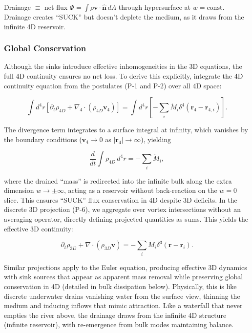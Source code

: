 Drainage $\equiv$ net flux $\Phi = \int \rho \mathbf{v} \cdot \hat{\mathbf{n}} \, dA$ through hypersurface at $w = \text{const}$. Drainage creates ``SUCK'' but doesn't deplete the medium, as it draws from the infinite 4D reservoir.

\subsubsection{Global Conservation}
Although the sinks introduce effective inhomogeneities in the 3D equations, the full 4D continuity ensures no net loss. To derive this explicitly, integrate the 4D continuity equation from the postulates (P-1 and P-2) over all 4D space:

\begin{equation}
\int d^4 r \left[ \partial_t \rho_{4D} + \nabla_4 \cdot (\rho_{4D} \mathbf{v}_4) \right] = \int d^4 r \left[ -\sum_i \dot{M}_i \delta^4(\mathbf{r}_4 - \mathbf{r}_{4,i}) \right].
\end{equation}

The divergence term integrates to a surface integral at infinity, which vanishes by the boundary conditions ($\mathbf{v}_4 \to 0$ as $|\mathbf{r}_4| \to \infty$), yielding

\begin{equation}
\frac{d}{dt} \int \rho_{4D} \, d^4 r = -\sum_i \dot{M}_i,
\end{equation}

where the drained ``mass'' is redirected into the infinite bulk along the extra dimension $w \to \pm \infty$, acting as a reservoir without back-reaction on the $w=0$ slice. This ensures ``SUCK'' flux conservation in 4D despite 3D deficits. In the discrete 3D projection (P-6), we aggregate over vortex intersections without an averaging operator, directly defining projected quantities as sums. This yields the effective 3D continuity:

\begin{equation}
\partial_t \rho_{3D} + \nabla \cdot (\rho_{3D} \mathbf{v}) = -\sum_i \dot{M}_i \delta^3(\mathbf{r} - \mathbf{r}_i).
\end{equation}

Similar projections apply to the Euler equation, producing effective 3D dynamics with sink sources that appear as apparent mass removal while preserving global conservation in 4D (detailed in bulk dissipation below). Physically, this is like discrete underwater drains vanishing water from the surface view, thinning the medium and inducing inflows that mimic attraction. Like a waterfall that never empties the river above, the drainage draws from the infinite 4D structure (infinite reservoir), with re-emergence from bulk modes maintaining balance.

